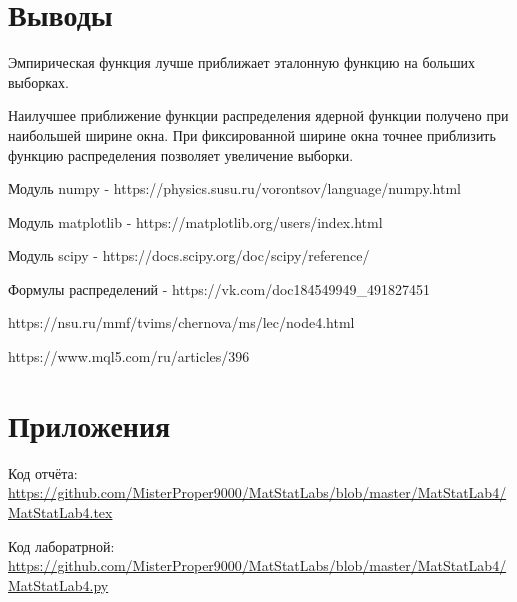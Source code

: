 \documentclass[a4]{article}
\begin{document}
\section{Выводы}
Эмпирическая функция лучше приближает эталонную функцию на больших выборках.

Наилучшее приближение функции распределения ядерной функции получено при наибольшей ширине окна. При фиксированной ширине окна точнее приблизить функцию распределения позволяет увеличение выборки.


\begin{thebibliography}{}
      Модуль numpy  -  https://physics.susu.ru/vorontsov/language/numpy.html
    
    Модуль matplotlib - https://matplotlib.org/users/index.html
    
    Модуль scipy - https://docs.scipy.org/doc/scipy/reference/
    
    Формулы распределений  -  https://vk.com/doc184549949\_491827451
    
    https://nsu.ru/mmf/tvims/chernova/ms/lec/node4.html
    
    https://www.mql5.com/ru/articles/396
\end{thebibliography}

\section{Приложения}


Код отчёта:\; \url{https://github.com/MisterProper9000/MatStatLabs/blob/master/MatStatLab4/MatStatLab4.tex}

Код лаборатрной:\; \url{https://github.com/MisterProper9000/MatStatLabs/blob/master/MatStatLab4/MatStatLab4.py}


\end{document}

